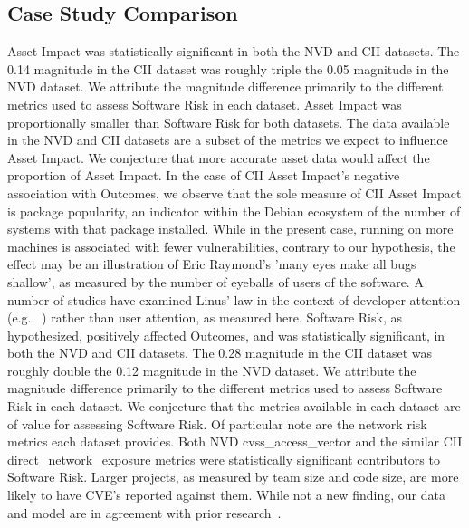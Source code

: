 \subsection{Case Study Comparison}
%		
Asset Impact was statistically significant in both the NVD and CII datasets. The 0.14 magnitude in the CII dataset was roughly triple the 0.05 magnitude in the NVD dataset. We attribute the magnitude difference primarily to the different metrics used to assess Software Risk in each dataset. Asset Impact was proportionally smaller than Software Risk for both datasets. The data available in the NVD and CII datasets are a subset of the metrics we expect to influence Asset Impact. We conjecture that more accurate asset data would affect the proportion of Asset Impact. In the case of CII Asset Impact's negative association with Outcomes, we observe that the sole measure of CII Asset Impact is package popularity, an indicator within the Debian ecosystem of the number of systems with that package installed. While in the present case, running on more machines is associated with fewer vulnerabilities, contrary to our hypothesis, the effect may be an illustration of Eric Raymond's 'many eyes make all bugs shallow', as measured by the number of eyeballs of users of the software. A number of studies have examined Linus' law in the context of developer attention (e.g. ~\cite{meneely2013when}) rather than user attention, as measured here. 
Software Risk, as hypothesized, positively affected Outcomes, and was statistically significant, in both the NVD and CII datasets. The 0.28 magnitude in the CII dataset was roughly double the 0.12 magnitude in the NVD dataset. We attribute the magnitude difference primarily to the different metrics used to assess Software Risk in each dataset. We conjecture that the metrics available in each dataset are of value for assessing Software Risk.  Of particular note are the network risk metrics each dataset provides. Both NVD cvss\_access\_vector and the similar CII direct\_network\_exposure metrics were statistically significant contributors to Software Risk. Larger projects, as measured by team size and code size, are more likely to have CVE's reported against them. While not a new finding, our data and model are in agreement with prior research~\cite{shin2011evaluating,meneely2013when}.

